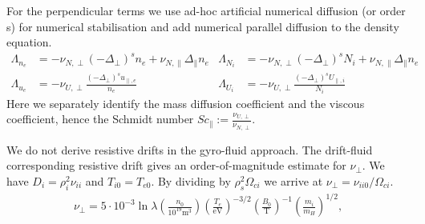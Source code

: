  For the perpendicular terms we use ad-hoc artificial numerical diffusion (or
 order s) for numerical stabilisation and add numerical parallel diffusion
 to the density equation.
\begin{align}
\label{eq:perpdiffNU}
\Lambda_{n_e} &=  -\nu_{N,\perp}(-\Delta_\perp)^s n_e + \nu_{N,\parallel}\Delta_\parallel n_e&
\Lambda_{N_i} &=  -\nu_{N,\perp}(-\Delta_\perp)^s N_i + \nu_{N,\parallel}\Delta_\parallel n_e& \\
\Lambda_{u_e} &=  -\nu_{U,\perp}\frac{(-\Delta_\perp)^s u_{\parallel,e}}{n_e} &
\Lambda_{U_i} &=  -\nu_{U,\perp}\frac{(-\Delta_\perp)^s U_{\parallel,i}}{N_i}
\end{align}
Here we separately identify the mass diffusion coefficient and the viscous
coefficient, hence the Schmidt number \(\mathit{Sc}_\parallel:=
\frac{\nu_{U,\perp}}{\nu_{N,\perp}}\).

We do not derive resistive drifts in the gyro-fluid approach.
The drift-fluid corresponding resistive drift gives an order-of-magnitude estimate for $\nu_\perp$.
We have  $D_i = \rho_i^2 \nu_{ii}$ and $T_{i0} = T_{e0}$.
By dividing by $\rho_s^2 \Omega_{ci}$ we arrive at $\nu_\perp = \nu_{ii0}/\Omega_{ci}$.
\begin{align}
\nu_\perp =
5\cdot 10^{-3} \ln \lambda
\left(\frac{n_0}{10^{19}\text{m}^3}\right)
\left(\frac{T_e}{\text{eV}}\right)^{-3/2}
\left(\frac{B_0}{\text{T}}\right)^{-1}
\left(\frac{m_i}{m_H}\right)^{1/2},
\end{align}

